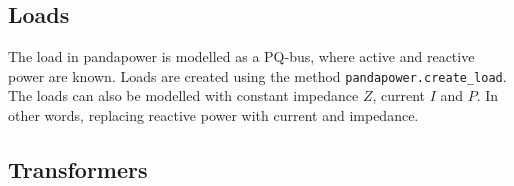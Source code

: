 \documentclass[class=book, crop=false]{standalone}
\begin{document}
\subsection{Loads}
The load in pandapower is modelled as a PQ-bus, where active and reactive power are known. Loads are created using the method \texttt{pandapower.create\_load}. The loads can also be modelled with constant impedance $Z$, current $I$ and $P$. In other words, replacing reactive power with current and impedance. 

\subsection{Transformers}
\end{document}
